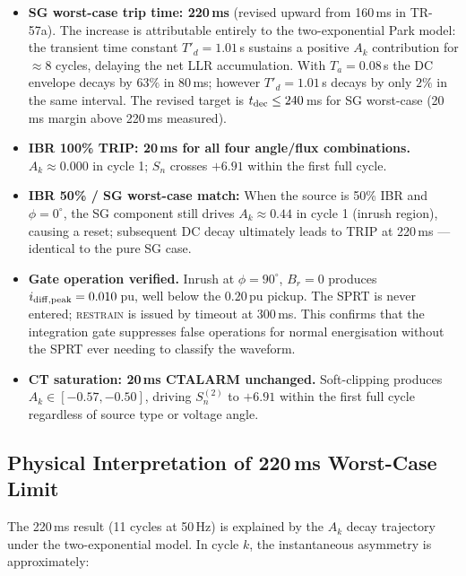 \documentclass[11pt, a4paper]{article}
\newcommand{\Ak}{A_k}
\begin{document}
\begin{itemize}
  \item \textbf{SG worst-case trip time: 220\,ms} (revised upward from
    160\,ms in TR-57a).  The increase is attributable entirely to the
    two-exponential Park model: the transient time constant $T'_d = 1.01\,$s
    sustains a positive $\Ak$ contribution for $\approx 8$ cycles, delaying
    the net LLR accumulation.  With $T_a = 0.08\,$s the DC envelope decays
    by $63\%$ in 80\,ms; however $T'_d = 1.01\,$s decays by only $2\%$
    in the same interval.  The revised target is $t_{\rm dec} \leq 240\,$ms
    for SG worst-case (20\,ms margin above 220\,ms measured).

  \item \textbf{IBR 100\% TRIP: 20\,ms for all four angle/flux
    combinations.}  $A_k \approx 0.000$ in cycle 1; $S_n$ crosses $+6.91$
    within the first full cycle.

  \item \textbf{IBR 50\% / SG worst-case match:} When the source is 50\%
    IBR and $\phi=0^\circ$, the SG component still drives $\Ak \approx 0.44$
    in cycle 1 (inrush region), causing a reset; subsequent DC decay
    ultimately leads to TRIP at 220\,ms — identical to the pure SG case.

  \item \textbf{Gate operation verified.}  Inrush at $\phi=90^\circ$,
    $B_r=0$ produces $i_{\rm diff,peak} = 0.010\,$pu, well below the
    $0.20\,$pu pickup.  The SPRT is never entered; \textsc{restrain} is
    issued by timeout at 300\,ms.  This confirms that the integration gate
    suppresses false operations for normal energisation without the SPRT
    ever needing to classify the waveform.

  \item \textbf{CT saturation: 20\,ms CTALARM unchanged.}  Soft-clipping
    produces $A_k \in [-0.57, -0.50]$, driving $S^{(2)}_n$ to $+6.91$
    within the first full cycle regardless of source type or voltage angle.
\end{itemize}

\subsection{Physical Interpretation of 220\,ms Worst-Case Limit}
\label{sec:sg_worst_case_220ms}

The 220\,ms result (11 cycles at 50\,Hz) is explained by the $\Ak$ decay
trajectory under the two-exponential model.  In cycle $k$, the instantaneous
asymmetry is approximately:
\end{document}
